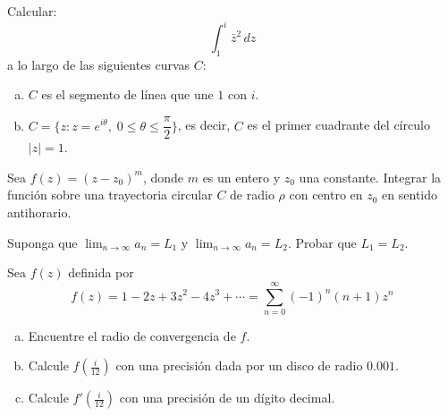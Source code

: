 \documentclass[11pt]{article}
\begin{document}
\begin{question}  %
    Calcular:
    \[ \int_1^i \bar{z}^2 \, dz \]
    a lo largo de las siguientes curvas $C$:
    \begin{enumerate}[a)]
        \item $C$ es el segmento de línea que une $1$ con $i$.
        \item $C = \{z : z = e^{i \theta}, \; 0 \leq \theta \leq \dfrac{\pi}{2}\} $, es decir, $C$ es el primer cuadrante del círculo $|z| = 1$.
    \end{enumerate}
\end{question}

\begin{question}  %
Sea $f(z) = (z - z_0)^m$, donde $m$ es un entero y $z_0$ una constante. Integrar la función sobre una trayectoria circular $C$ de radio $\rho$ con centro en $z_0$ en sentido antihorario. 
\end{question}


\begin{question}%
    Suponga que $\lim_{n \rightarrow \infty} a_n = L_1$ y $\lim_{n \rightarrow \infty} a_n = L_2$. Probar que $L_1 = L_2$.
\end{question}

\begin{question}  %
Sea $f(z)$ definida por
\[ f(z) = 1 - 2 z + 3 z^2 -4 z^3 + \cdots = \sum_{n=0}^{\infty} (-1)^n (n + 1) z^n \]
\begin{enumerate}[a)]
    \item Encuentre el radio de convergencia de $f$.
    \item Calcule $f(\tfrac{i}{12})$ con una precisión dada por un disco de radio $0.001$.
    \item Calcule $f'(\tfrac{i}{12})$ con una precisión de un dígito decimal.
\end{enumerate}
\end{question}
\end{document}
